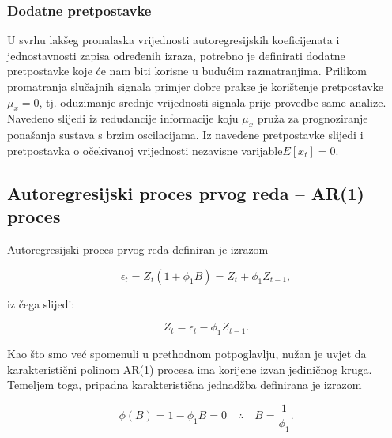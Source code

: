 \documentclass[a4paper,12pt,oneside]{memoir}
\begin{document}
            \subsubsection{Dodatne pretpostavke}
            
                U svrhu lakšeg pronalaska vrijednosti autoregresijskih koeficijenata i jednostavnosti zapisa određenih izraza, potrebno je definirati dodatne pretpostavke koje će nam biti korisne u budućim razmatranjima. Prilikom promatranja slučajnih signala primjer dobre prakse je korištenje pretpostavke $\mu_x=0$, tj. oduzimanje srednje vrijednosti signala prije provedbe same analize. Navedeno slijedi iz redudancije informacije koju $\mu_x$ pruža za prognoziranje ponašanja sustava s brzim oscilacijama. Iz navedene pretpostavke slijedi i pretpostavka o očekivanoj vrijednosti nezavisne varijable\footnotemark[6] $E[x_t]=0$.


            \subsection{Autoregresijski proces prvog reda -- AR(1) proces}

                Autoregresijski proces prvog reda definiran je izrazom

                \begin{equation}
                    \epsilon_t=Z_t(1+\phi_1B)=Z_t+\phi_1Z_{t-1},
                \end{equation}

                iz čega slijedi:

                \begin{equation}
                    Z_t=\epsilon_t-\phi_1Z_{t-1}.
                \end{equation}

                Kao što smo već spomenuli u prethodnom potpoglavlju, nužan je uvjet da karakteristični polinom AR(1) procesa ima korijene izvan jediničnog kruga. Temeljem toga, pripadna karakteristična jednadžba definirana je izrazom

                \begin{equation}
                    \phi(B)=1-\phi_1B=0 \quad \therefore \quad B= \frac{1}{\phi_1}.
                    \label{eq:ar1_stationary}
                \end{equation}
\end{document}
